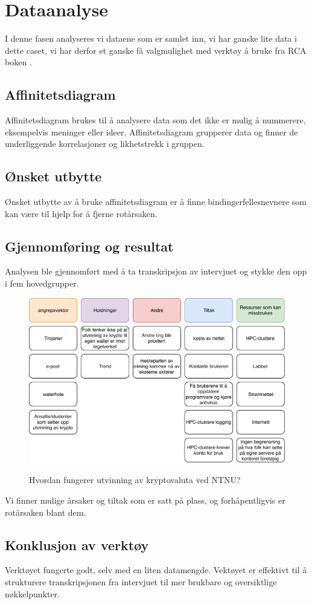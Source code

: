 \chapter{Dataanalyse}
I denne fasen analyseres vi dataene som er samlet inn, vi har ganske lite data i dette caset, vi har derfor et ganske få valgmulighet med verktøy å bruke fra RCA boken \cite{RCA}.

\section{Affinitetsdiagram}
Affinitetsdiagram brukes til å analysere data som det ikke er mulig å nummerere, eksempelvis meninger eller ideer. Affinitetsdiagram grupperer data og finner de underliggende korrelasjoner og likhetstrekk i gruppen.


\section{Ønsket utbytte}
Ønsket utbytte av å bruke affinitetsdiagram er å finne bindinger\/fellesnevnere som kan være til hjelp for å fjerne rotårsaken. 

\section{Gjennomføring og resultat}
Analysen ble gjennomført med å ta transkripsjon av intervjuet og stykke den opp i fem hovedgrupper.     

\begin{figure}[H]
    \centering
    \includegraphics[scale=0.6]{case_3/bilder/AD.pdf}
    \label{fig:AD_miner}
    \caption[Analyse av intervju]{Hvordan fungerer utvinning av kryptovaluta ved NTNU?}
\end{figure}

Vi finner mulige årsaker og tiltak som er satt på plass, og forhåpentligvis er rotårsaken blant dem.

\section{Konklusjon av verktøy}
Verktøyet fungerte godt, selv med en liten datamengde. Vektøyet er effektivt til å strukturere transkripsjonen fra intervjuet til mer brukbare og oversiktlige nøkkelpunkter. 
